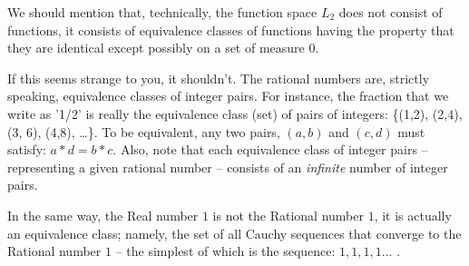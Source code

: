 \documentclass{article}
\begin{document}
We should mention that, technically, the function space $L_2$ does not 
consist of functions, it consists of 
equivalence classes of functions having the property
that they are identical except possibly on a set of measure $0$.

If this seems strange to you, it shouldn't. The rational numbers are, strictly 
speaking, equivalence classes of integer pairs.
For instance, the fraction that we write as '1/2' is really the 
equivalence class (set) of pairs of integers: 
\{(1,2), (2,4), (3, 6), (4,8), \ldots \}.
To be equivalent, any two pairs, $(a, b)$ and $(c, d)$ must satisfy: 
$a * d = b * c$. Also, note that each equivalence class of integer pairs --
representing a given rational number -- consists of an {\em infinite\/} number 
of integer pairs.

In the same way, the Real number $1$ is not the Rational number $1$, it is 
actually an equivalence class; namely, the set of all Cauchy sequences that 
converge to the Rational number $1$ -- the simplest of which is the 
sequence: $1, 1, 1, 1\ldots$ .
\end{document}
